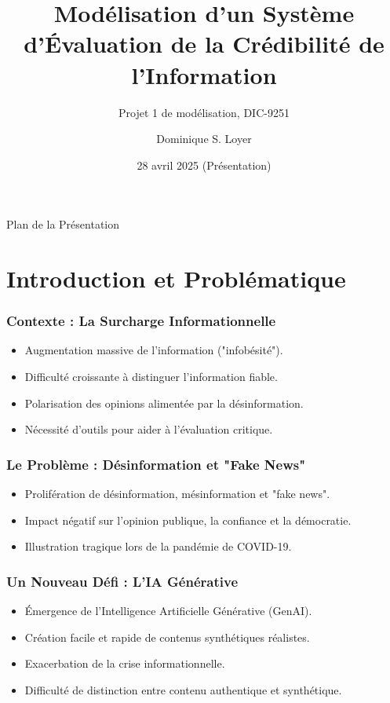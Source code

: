 \documentclass[9pt]{beamer}
\title[Système d'évaluation de crédibilité d'information]{Modélisation d'un Système d'Évaluation de la Crédibilité de l'Information}
\subtitle{Projet 1 de modélisation, DIC-9251}
\author{Dominique S. Loyer}
\institute{UQAM \\ \texttt{loyer.dominique@courrier.uqam.ca}}
\date{28 avril 2025 (Présentation)} %
\begin{document}
\begin{frame}
  \titlepage
\end{frame}

\begin{frame}{Plan de la Présentation}
  \tableofcontents
\end{frame}

\section{Introduction et Problématique}
\begin{frame}
  \frametitle{Contexte : La Surcharge Informationnelle}
  \begin{itemize}
    \item Augmentation massive de l'information ("infobésité").
    \item Difficulté croissante à distinguer l'information fiable.
    \item Polarisation des opinions alimentée par la désinformation. \citet{Metzger2010}
    \item Nécessité d'outils pour aider à l'évaluation critique.
  \end{itemize}
\end{frame}

\begin{frame}
  \frametitle{Le Problème : Désinformation et "Fake News"}
  \begin{itemize}
    \item Prolifération de désinformation, mésinformation et "fake news". \citet{Oshikawa2019A, Zhou2022A, Pescuma2025}
    \item Impact négatif sur l'opinion publique, la confiance et la démocratie. \citet{Loth2024, Zhou2022A}
    \item Illustration tragique lors de la pandémie de COVID-19. \citet{Loth2024, Chen2024Combating, Metzger2010}
  \end{itemize}
\end{frame}

\begin{frame}
  \frametitle{Un Nouveau Défi : L'IA Générative}
  \begin{itemize}
    \item Émergence de l'Intelligence Artificielle Générative (GenAI).\citet{Loth2024, Chen2024Combating}
    \item Création facile et rapide de contenus synthétiques réalistes. \citet{Loth2024, Willems2020Modeling, Thibault2025A}
    \item Exacerbation de la crise informationnelle.
    \item Difficulté de distinction entre contenu authentique et synthétique.
  \end{itemize}
\end{frame}
\end{document}
